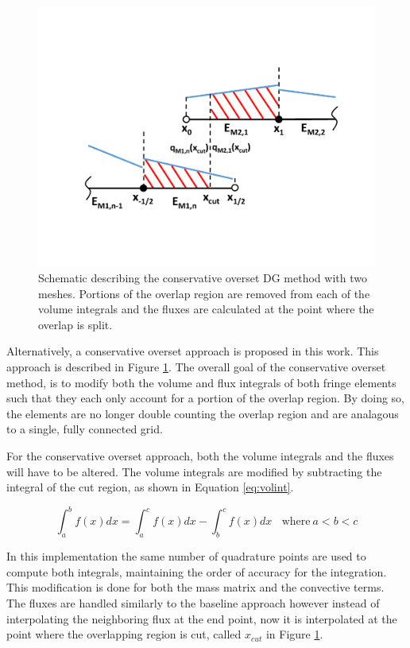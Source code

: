 \documentclass[11pt]{article}
\begin{document}
\begin{figure}[h]
\centering
  \includegraphics[width=\textwidth,trim={0 4cm 0 4cm},clip]{Figures/DGConsOverset.pdf}
  \caption{Schematic describing the conservative overset DG method with two meshes. Portions of the overlap region are removed from each of the volume integrals and the fluxes are calculated at the point where the overlap is split.}
  \label{fig:cons}
\end{figure}

Alternatively, a conservative overset approach is proposed in this work. This approach
is described in Figure \ref{fig:cons}. The overall 
goal of the conservative overset method, is to modify both the volume and flux
integrals of both fringe elements such that they each only account for a portion 
of the overlap region. By doing so, the elements are no longer double counting
the overlap region and are analagous to a single, fully connected grid. 

For the conservative overset approach, both the volume integrals 
and the fluxes will have to be altered. The volume integrals are modified
by subtracting the integral of the cut region, as shown in Equation \eqref{eq:volint}. 

\begin{equation}
\int_a^b f(x) dx = \int_a^c f(x) dx - \int_b^c f(x) dx  \ \ \ \ \text{where} \ a<b<c
\label{eq:volint}
\end{equation}

In this implementation the same number of quadrature points are used to compute
both integrals, maintaining the order of accuracy for the integration. This modification
is done for both the mass matrix and the convective terms. 
The fluxes are handled similarly to the baseline approach however instead of interpolating
the neighboring flux at the end point, now it is interpolated at the point where the overlapping
region is cut, called $x_{cut}$ in Figure \ref{fig:cons}.
\end{document}

